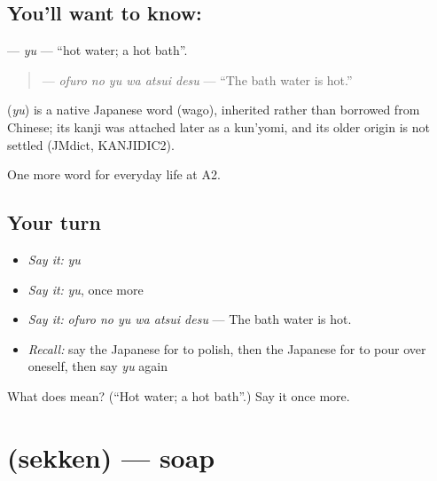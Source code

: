 \subsection*{You'll want to know: }
\textbf{} — \emph{yu} — \textquotedblleft{}hot water; a hot bath\textquotedblright{}.

\begin{quote}
\textbf{  } — \emph{ofuro no yu wa atsui desu} — \textquotedblleft{}The bath water is hot.\textquotedblright{}
\end{quote}

\begin{cousinweb}
\textbf{} (\emph{yu}) is a native Japanese word (wago), inherited rather than borrowed from Chinese; its kanji was attached later as a kun'yomi, and its older origin is not settled (JMdict, KANJIDIC2).
\end{cousinweb}

\begin{grammarlens}[title={What you've built}]
One more word for everyday life at A2.
\end{grammarlens}

\subsection*{Your turn}
\begin{itemize}
\raggedright
  \item \emph{Say it:} \emph{yu}
  \item \emph{Say it:} \emph{yu}, once more
  \item \emph{Say it:} \emph{ofuro no yu wa atsui desu} — The bath water is hot.
  \item \emph{Recall:} say the Japanese for to polish, then the Japanese for to pour over oneself, then say \emph{yu} again
\end{itemize}

\begin{tcolorbox}[breakable,colback=teal!4,colframe=teal!35!black,title={Before you move on}]
What does  mean? (\textquotedblleft{}Hot water; a hot bath\textquotedblright{}.) Say it once more.
\end{tcolorbox}
\section[\texorpdfstring{\ja{せっけん} (sekken)}{せっけん (sekken)}]{ (sekken) — soap}

